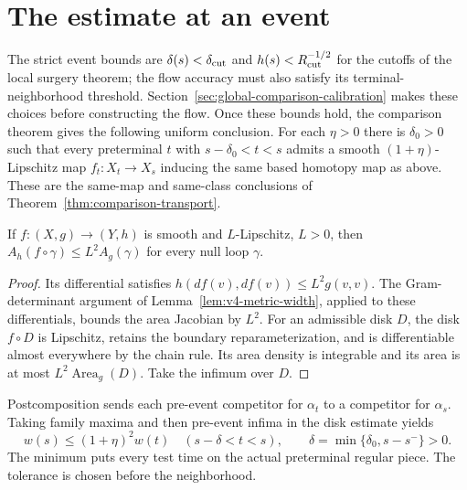 \section{The estimate at an event}

The strict event bounds are $\delta(s)<\delta_{\rm cut}$ and
$h(s)<R_{\rm cut}^{-1/2}$ for the cutoffs of the local surgery theorem;
the flow accuracy must also satisfy its terminal-neighborhood threshold.
Section~\ref{sec:global-comparison-calibration} makes these choices before
constructing the flow. Once these bounds hold, the comparison
theorem gives the following uniform conclusion. For each $\eta>0$
there is $\delta_0>0$ such that every preterminal $t$ with
$s-\delta_0<t<s$ admits a smooth $(1+\eta)$-Lipschitz map
$f_t:X_t\to X_s$ inducing the same based homotopy map as above.
These are the same-map and same-class conclusions of
Theorem~\ref{thm:comparison-transport}.

\begin{lemma}
\label{lem:v4-disk-transport}
If $f:(X,g)\to(Y,h)$ is smooth and $L$-Lipschitz, $L>0$, then
$A_h(f\circ\gamma)\leq L^2 A_g(\gamma)$ for every null loop $\gamma$.
\end{lemma}
\begin{proof}
Its differential satisfies $h(df(v),df(v))\leq L^2g(v,v)$.
The Gram-determinant argument of Lemma~\ref{lem:v4-metric-width},
applied to these differentials, bounds the area Jacobian by $L^2$.
For an admissible disk $D$, the disk $f\circ D$ is Lipschitz, retains
the boundary reparameterization, and is differentiable almost everywhere
by the chain rule. Its area density is integrable and its area is at most
$L^2\operatorname{Area}_g(D)$. Take the infimum over $D$.
\end{proof}

Postcomposition sends each pre-event competitor for $\alpha_t$ to a
competitor for $\alpha_s$. Taking family maxima and then pre-event
infima in the disk estimate yields
\begin{equation}
 w(s)\leq(1+\eta)^2w(t)\quad(s-\delta<t<s),\qquad
 \delta=\min\{\delta_0,s-s^-\}>0.
 \label{eq:v4-event-factor}
\end{equation}
The minimum puts every test time on the actual preterminal regular
piece. The tolerance is chosen before the neighborhood.


